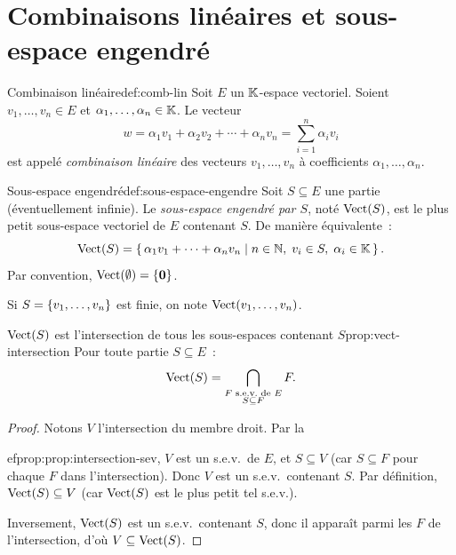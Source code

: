 \section{Combinaisons linéaires et sous-espace engendré}\label{sec:comb-lin}

\begin{definition}{Combinaison linéaire}{def:comb-lin}
  Soit $E$ un ${\mathbb{K}}$-espace vectoriel. Soient $v_1,\ldots,v_n\in E$ et
  $\alpha_1,\ldots,\alpha_n\in{\mathbb{K}}$. Le vecteur
  \[
    w = \alpha_1 v_1 + \alpha_2 v_2 + \cdots + \alpha_n v_n
    = \sum_{i=1}^{n}\alpha_i v_i
  \]
  est appelé \emph{combinaison linéaire} des vecteurs $v_1,\ldots,v_n$
  à coefficients $\alpha_1,\ldots,\alpha_n$.
\end{definition}

\begin{definition}{Sous-espace engendré}{def:sous-espace-engendre}
  Soit $S\subseteq E$ une partie (éventuellement infinie). Le
  \emph{sous-espace engendré par $S$}, noté $\operatorname{Vect}(S)$, est le plus
  petit sous-espace vectoriel de $E$ contenant $S$. De manière
  équivalente~:
  \[
    \Vect(S) = \setcond{\alpha_1 v_1+\cdots+\alpha_n v_n}{%
      n\in\N,\; v_i\in S,\; \alpha_i\in\K}.
  \]
  Par convention, $\operatorname{Vect}(\emptyset)=\left\{\mathbf{0}\right\}$.

  Si $S=\left\{v_1,\ldots,v_n\right\}$ est finie, on note
  $\operatorname{Vect}(v_1,\ldots,v_n)$.
\end{definition}

\begin{proposition}{$\operatorname{Vect}(S)$ est l'intersection de tous les
  sous-espaces contenant $S$}{prop:vect-intersection}
  Pour toute partie $S\subseteq E$~:
  \[
    \operatorname{Vect}(S) = \bigcap_{\substack{F\text{ s.e.v.\ de }E \\ S\subseteq F}} F.
  \]
\end{proposition}

\begin{proof}
  Notons $V$ l'intersection du membre droit. Par la
  
ef{prop:prop:intersection-sev}, $V$ est un s.e.v.\ de $E$, et
  $S\subseteq V$ (car $S\subseteq F$ pour chaque $F$ dans
  l'intersection). Donc $V$ est un s.e.v.\ contenant $S$. Par
  définition, $\operatorname{Vect}(S)\subseteq V$ (car $\operatorname{Vect}(S)$ est le plus petit
  tel s.e.v.).

  Inversement, $\operatorname{Vect}(S)$ est un s.e.v.\ contenant $S$, donc il
  apparaît parmi les $F$ de l'intersection, d'où
  $V\subseteq\operatorname{Vect}(S)$.
\end{proof}

